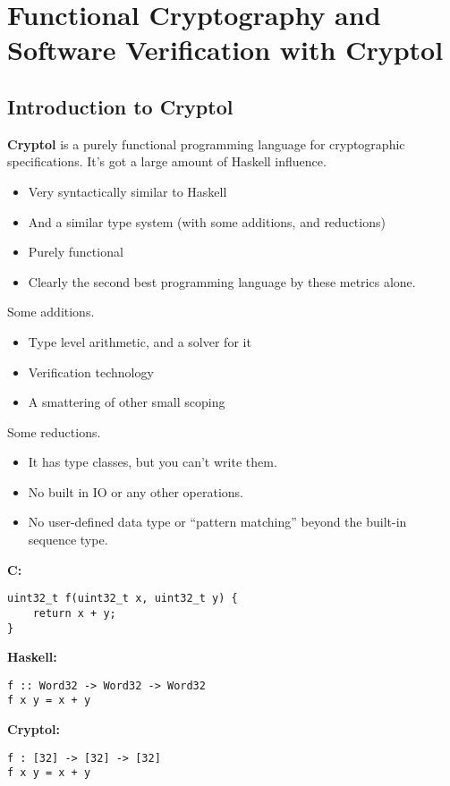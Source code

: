 \chapter{Functional Cryptography and Software Verification with Cryptol}

\section{Introduction to Cryptol}

\textbf{Cryptol} is a purely functional programming language for cryptographic specifications. It's got a large amount of Haskell influence.
\begin{itemize}
	\item Very syntactically similar to Haskell
	\item And a similar type system (with some additions, and reductions)
	\item Purely functional
	\item Clearly the second best programming language by these metrics alone.
\end{itemize}

Some additions.
\begin{itemize}
	\item Type level arithmetic, and a solver for it
	\item Verification technology
	\item A smattering of other small scoping 
\end{itemize}

Some reductions.
\begin{itemize}
	\item It has type classes, but you can't write them.
	\item No built in IO or any other operations.
	\item No user-defined data type or ``pattern matching'' beyond the built-in sequence type.
\end{itemize}

\newpage
\noindent\textbf{C:}
\begin{lstlisting}[style=C]
uint32_t f(uint32_t x, uint32_t y) {
	return x + y;
}
\end{lstlisting}
\vspace{8pt}
\textbf{Haskell:}
\begin{lstlisting}[style=haskell]
f :: Word32 -> Word32 -> Word32
f x y = x + y
\end{lstlisting}

\noindent\textbf{Cryptol:}
\begin{lstlisting}[style=haskell]
f : [32] -> [32] -> [32]
f x y = x + y
\end{lstlisting}

